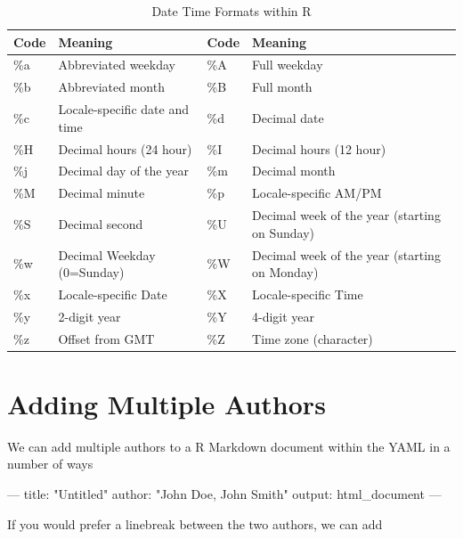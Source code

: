 \documentclass[]{book}
\newenvironment{Shaded}{\begin{snugshade}}{\end{snugshade}}
\newcommand{\StringTok}[1]{\textcolor[rgb]{0.31,0.60,0.02}{#1}}
\newcommand{\OtherTok}[1]{\textcolor[rgb]{0.56,0.35,0.01}{#1}}
\newcommand{\FunctionTok}[1]{\textcolor[rgb]{0.00,0.00,0.00}{#1}}
\newcommand{\AttributeTok}[1]{\textcolor[rgb]{0.77,0.63,0.00}{#1}}
\begin{document}
\begin{table}

\caption{\label{tab:dateTimeFormats}Date Time Formats within R}
\centering
\begin{tabular}[t]{l|l|l|l}
\hline
Code & Meaning & Code & Meaning\\
\hline
\%a & Abbreviated weekday & \%A & Full weekday\\
\hline
\%b & Abbreviated month & \%B & Full month\\
\hline
\%c & Locale-specific date and time & \%d & Decimal date\\
\hline
\%H & Decimal hours (24 hour) & \%I & Decimal hours (12 hour)\\
\hline
\%j & Decimal day of the year & \%m & Decimal month\\
\hline
\%M & Decimal minute & \%p & Locale-specific AM/PM\\
\hline
\%S & Decimal second & \%U & Decimal week of the year (starting on Sunday)\\
\hline
\%w & Decimal Weekday (0=Sunday) & \%W & Decimal week of the year (starting on Monday)\\
\hline
\%x & Locale-specific Date & \%X & Locale-specific Time\\
\hline
\%y & 2-digit year & \%Y & 4-digit year\\
\hline
\%z & Offset from GMT & \%Z & Time zone (character)\\
\hline
\end{tabular}
\end{table}

\section{Adding Multiple Authors}\label{adding-multiple-authors}

We can add multiple authors to a R Markdown document within the YAML in
a number of ways

\begin{Shaded}
\begin{Highlighting}[]
\OtherTok{---}
\FunctionTok{title:}\AttributeTok{ }\StringTok{"Untitled"}
\FunctionTok{author:}\AttributeTok{ }\StringTok{"John Doe, John Smith"}
\FunctionTok{output:}\AttributeTok{ html_document}
\OtherTok{---}
\end{Highlighting}
\end{Shaded}

If you would prefer a linebreak between the two authors, we can add
\end{document}
